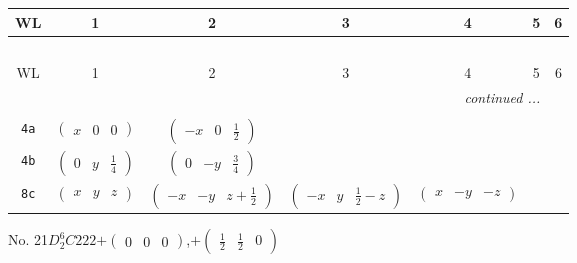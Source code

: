 \documentclass[fleqn,9pt,landscape]{jsarticle}
\begin{document}
\begin{center}
\renewcommand{\arraystretch}{1.2}
\begin{longtable}{ccccccc}
 \hline \hline
WL & 1 & 2 & 3 & 4 & 5 & 6 \\ \hline \endfirsthead

\multicolumn{6}{l}{\tablename\ \thetable{}} \\
 \hline \hline
WL & 1 & 2 & 3 & 4 & 5 & 6 \\ \hline \endhead

 \hline \hline
\multicolumn{6}{r}{\footnotesize\it continued ...} \\ \endfoot

 \hline \hline
\multicolumn{6}{r}{} \\ \endlastfoot

{\tt 4a} & $ \begin{pmatrix} x & 0 & 0 \end{pmatrix} $ & $ \begin{pmatrix} - x & 0 & \frac{1}{2} \end{pmatrix} $ & $  $ & $  $ \\ \hline
{\tt 4b} & $ \begin{pmatrix} 0 & y & \frac{1}{4} \end{pmatrix} $ & $ \begin{pmatrix} 0 & - y & \frac{3}{4} \end{pmatrix} $ & $  $ & $  $ \\ \hline
{\tt 8c} & $ \begin{pmatrix} x & y & z \end{pmatrix} $ & $ \begin{pmatrix} - x & - y & z + \frac{1}{2} \end{pmatrix} $ & $ \begin{pmatrix} - x & y & \frac{1}{2} - z \end{pmatrix} $ & $ \begin{pmatrix} x & - y & - z \end{pmatrix} $ \\
\end{longtable}
\end{center}
\newpage
No. 21\quad$D_{2}^{6}$\quad$C222$\quad[ orthorhombic ]\quad$+\begin{pmatrix} 0 & 0 & 0 \end{pmatrix}$,\quad $+\begin{pmatrix} \frac{1}{2} & \frac{1}{2} & 0 \end{pmatrix}$
\end{document}
